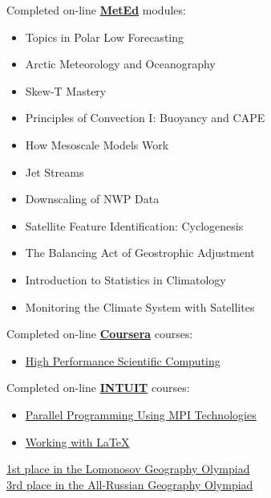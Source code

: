 \documentclass[a4paper,11pt]{article}
\begin{document}
\vspace{.1in}
Completed on-line \textbf{\href{https://www.meted.ucar.edu/}{MetEd}} modules:
\begin{itemize}
        \item Topics in Polar Low Forecasting
        \item Arctic Meteorology and Oceanography
        \item Skew-T Mastery
        \item Principles of Convection I: Buoyancy and CAPE
        \item How Mesoscale Models Work
        \item Jet Streams
        \item Downscaling of NWP Data
        \item Satellite Feature Identification: Cyclogenesis
        \item The Balancing Act of Geostrophic Adjustment
        \item Introduction to Statistics in Climatology
        \item Monitoring the Climate System with Satellites
\end{itemize}

\vspace{.1in}
Completed on-line \textbf{\href{https://www.coursera.org}{Coursera}} courses:
\begin{itemize}
        \item {\href{https://www.coursera.org/course/scicomp}{High Performance Scientific Computing}}
\end{itemize}

\vspace{.1in}
Completed on-line \textbf{\href{http://www.intuit.ru/en/node/32/}{INTUIT}} courses:
\begin{itemize}
        \item {\href{http://www.intuit.ru/sites/default/files/diploma/d/e/n/n/i/NOU__INTUIT_-2-699590-OLF.jpg}{Parallel Programming Using MPI Technologies}}
        \item {\href{http://www.intuit.ru/sites/default/files/diploma/d/e/n/n/i/Nekommercheskoe_obrazovatelnoe_chastnoe_uchrejdenie_vyisshego_professionalnogo__obrazovaniya__Natsionalnyiy_otkryityiy_universitet__INTUIT_-2-790692-OLF.jpg}{Working with LaTeX}}
\end{itemize}

\vspace{.1in}
\href{http://lomonosov.msu.ru/}{1st place in the Lomonosov Geography Olympiad} \\
\href{http://rosolymp.ru/index.php?option=com_content&view=article&id=6455&Itemid=917}{3rd place in the All-Russian Geography Olympiad}
\end{document}
